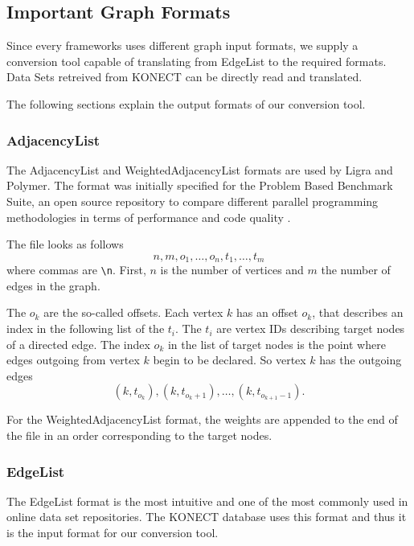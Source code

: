 
\subsection{Important Graph Formats}
Since every frameworks uses different graph input formats, we supply a conversion tool capable of translating from EdgeList to the required formats.
Data Sets retreived from KONECT can be directly read and translated.

The following sections explain the output formats of our conversion tool.
\subsubsection{AdjacencyList}
The AdjacencyList and WeightedAdjacencyList formats are used by Ligra and Polymer. The format was initially specified for the Problem Based Benchmark Suite, an open source repository to compare different parallel programming methodologies in terms of performance and code quality \cite{pbbs}.

The file looks as follows
\begin{equation*}
	n, m, o_1, \ldots, o_n, t_1, \ldots, t_m
\end{equation*}
where commas are \texttt{\textbackslash n}. First, $n$ is the number of vertices and $m$ the number of edges in the graph.

The $o_k$ are the so-called offsets. Each vertex $k$ has an offset $o_k$, that describes an index in the following list of the $t_i$.
The $t_i$ are vertex IDs describing target nodes of a directed edge. 
The index $o_k$ in the list of target nodes is the point where edges outgoing from vertex $k$ begin to be declared. So vertex $k$ has the outgoing edges
\begin{equation*}
	(k, t_{o_k}), (k, t_{o_k+1}),\ldots, (k, t_{o_{k+1}-1}).
\end{equation*}

For the WeightedAdjacencyList format, the weights are appended to the end of the file in an order corresponding to the target nodes.

\subsubsection{EdgeList}
The EdgeList format is the most intuitive and one of the most commonly used in online data set repositories. The KONECT database uses this format and thus it is the input format for our conversion tool.

